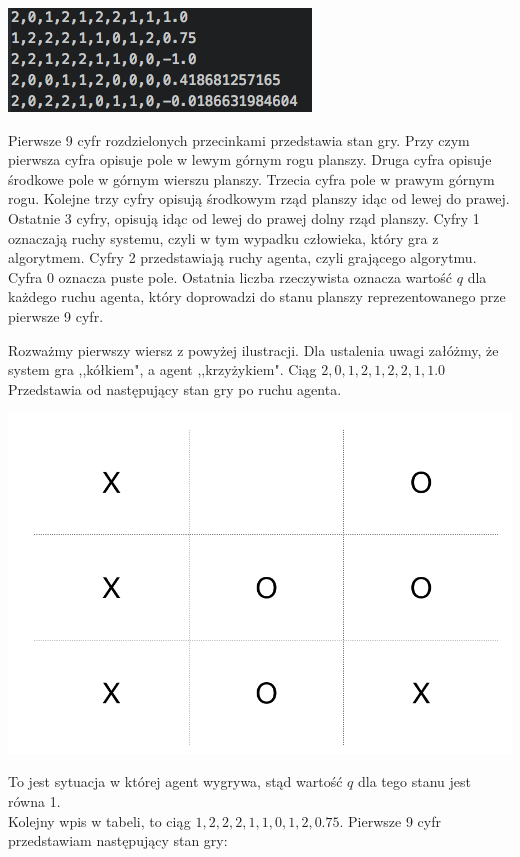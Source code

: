 \documentclass[licencjacka]{pracamgr}
\begin{document}
\begin{flushleft}
	\includegraphics [scale=0.8] {QTable_ex.png}
\end{flushleft}

Pierwsze 9 cyfr rozdzielonych przecinkami przedstawia stan gry. Przy czym pierwsza cyfra opisuje pole w lewym górnym rogu planszy. Druga cyfra opisuje środkowe pole w górnym wierszu planszy. Trzecia cyfra pole w prawym górnym rogu. Kolejne trzy cyfry opisują środkowym rząd planszy idąc od lewej do prawej. Ostatnie 3 cyfry, opisują idąc od lewej do prawej dolny rząd planszy.  Cyfry 1 oznaczają ruchy systemu, czyli w tym wypadku człowieka, który gra z algorytmem. Cyfry 2 przedstawiają ruchy agenta, czyli grającego algorytmu. Cyfra 0 oznacza puste pole. Ostatnia liczba rzeczywista oznacza wartość  $q$ dla każdego ruchu agenta, który doprowadzi do stanu planszy reprezentowanego prze pierwsze 9 cyfr. 

Rozważmy pierwszy wiersz z powyżej ilustracji. Dla ustalenia uwagi załóżmy, że system gra ,,kółkiem", a agent ,,krzyżykiem". Ciąg $2, 0, 1, 2, 1, 2,  2, 1, 1.0$ Przedstawia od następujący stan gry po ruchu agenta.

\begin{flushleft}
	\includegraphics [scale=0.2] {ttt_1.png}
\end{flushleft}

To jest sytuacja w której agent wygrywa, stąd wartość $q$ dla tego stanu jest równa 1. \\
Kolejny wpis w tabeli, to ciąg $1, 2, 2, 2, 1, 1, 0, 1, 2, 0.75$. Pierwsze 9 cyfr przedstawiam następujący stan gry:
\end{document}

